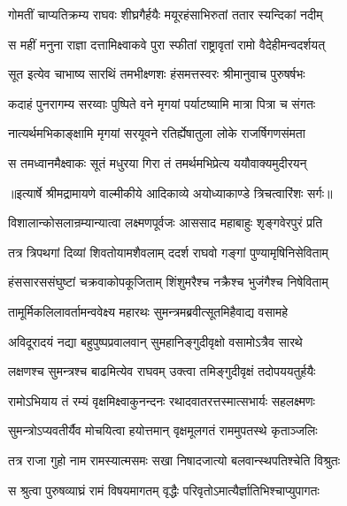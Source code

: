 \twolineshloka
{गोमतीं चाप्यतिक्रम्य राघवः शीघ्रगैर्हयैः}
{मयूरहंसाभिरुतां ततार स्यन्दिकां नदीम्} %

\twolineshloka
{स महीं मनुना राज्ञा दत्तामिक्ष्वाकवे पुरा}
{स्फीतां राष्ट्रावृतां रामो वैदेहीमन्वदर्शयत्} %

\twolineshloka
{सूत इत्येव चाभाष्य सारथिं तमभीक्ष्णशः}
{हंसमत्तस्वरः श्रीमानुवाच पुरुषर्षभः} %

\twolineshloka
{कदाहं पुनरागम्य सरय्वाः पुष्पिते वने}
{मृगयां पर्याटष्यामि मात्रा पित्रा च संगतः} %

\twolineshloka
{नात्यर्थमभिकाङ्क्षामि मृगयां सरयूवने}
{रतिर्ह्येषातुला लोके राजर्षिगणसंमता} %

\twolineshloka
{स तमध्वानमैक्ष्वाकः सूतं मधुरया गिरा}
{तं तमर्थमभिप्रेत्य ययौवाक्यमुदीरयन्} %


{॥इत्यार्षे श्रीमद्रामायणे वाल्मीकीये आदिकाव्ये अयोध्याकाण्डे त्रिचत्वारिंशः सर्गः॥}


\twolineshloka
{विशालान्कोसलान्रम्यान्यात्वा लक्ष्मणपूर्वजः}
{आससाद महाबाहुः शृङ्गवेरपुरं प्रति} %

\twolineshloka
{तत्र त्रिपथगां दिव्यां शिवतोयामशैवलाम्}
{ददर्श राघवो गङ्गां पुण्यामृषिनिसेविताम्} %

\twolineshloka
{हंससारससंघुष्टां चक्रवाकोपकूजिताम्}
{शिंशुमरैश्च नक्रैश्च भुजंगैश्च निषेविताम्} %

\twolineshloka
{तामूर्मिकलिलावर्तामन्ववेक्ष्य महारथः}
{सुमन्त्रमब्रवीत्सूतमिहैवाद्य वसामहे} %

\twolineshloka
{अविदूरादयं नद्या बहुपुष्पप्रवालवान्}
{सुमहानिङ्गुदीवृक्षो वसामोऽत्रैव सारथे} %

\twolineshloka
{लक्षणश्च सुमन्त्रश्च बाढमित्येव राघवम्}
{उक्त्वा तमिङ्गुदीवृक्षं तदोपययतुर्हयैः} %

\twolineshloka
{रामोऽभियाय तं रम्यं वृक्षमिक्ष्वाकुनन्दनः}
{रथादवातरत्तस्मात्सभार्यः सहलक्ष्मणः} %

\twolineshloka
{सुमन्त्रोऽप्यवतीर्यैव मोचयित्वा हयोत्तमान्}
{वृक्षमूलगतं राममुपतस्थे कृताञ्जलिः} %

\twolineshloka
{तत्र राजा गुहो नाम रामस्यात्मसमः सखा}
{निषादजात्यो बलवान्स्थपतिश्चेति विश्रुतः} %

\twolineshloka
{स श्रुत्वा पुरुषव्याघ्रं रामं विषयमागतम्}
{वृद्धैः परिवृतोऽमात्यैर्ज्ञातिभिश्चाप्युपागतः} %

